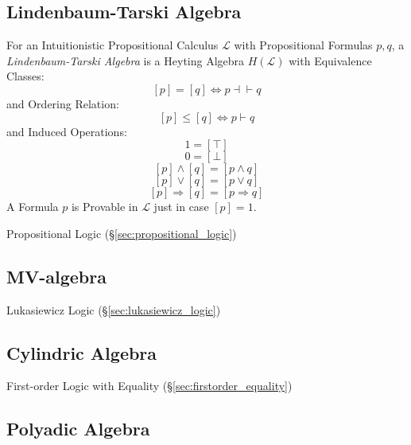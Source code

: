 \subsection{Lindenbaum-Tarski Algebra}\label{sec:lindenbaum_tarski}

\cite{awodey06}
For an Intuitionistic Propositional Calculus $\mathcal{L}$ with
Propositional Formulas $p,q$, a \emph{Lindenbaum-Tarski Algebra} is a
Heyting Algebra $H(\mathcal{L})$ with Equivalence Classes:
\[
  [p] = [q] \Leftrightarrow p \dashv \vdash q
\]
and Ordering Relation:
\[
  [p] \leq [q] \Leftrightarrow p \vdash q
\]
and Induced Operations:
\[
  1 = [\top]
\]\[
  0 = [\bot]
\]\[
  [p] \wedge [q] = [p \wedge q]
\]\[
  [p] \vee [q] = [p \vee q]
\]\[
  [p] \Rightarrow [q] = [p \Rightarrow q]
\]
A Formula $p$ is Provable in $\mathcal{L}$ just in case $[p] = 1$.

Propositional Logic (\S\ref{sec:propositional_logic})



\subsection{MV-algebra}\label{sec:mv_algebra}

Lukasiewicz Logic (\S\ref{sec:lukasiewicz_logic})



\subsection{Cylindric Algebra}\label{sec:cylindric_algebra}

First-order Logic with Equality (\S\ref{sec:firstorder_equality})



\subsection{Polyadic Algebra}\label{sec:polyadic_algebra}


